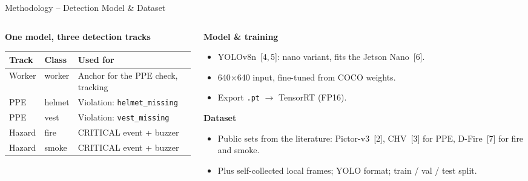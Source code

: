 \documentclass[aspectratio=169,10pt]{beamer}
\begin{document}
\begin{frame}{Methodology -- Detection Model \& Dataset}
  \begin{columns}[T]
    \begin{column}{0.48\textwidth}
      \small\textbf{One model, three detection tracks}\par\vspace{0.3em}
      \scriptsize
      \renewcommand{\arraystretch}{1.2}
      \begin{tabular}{@{}lll@{}}
        \toprule
        \textbf{Track} & \textbf{Class} & \textbf{Used for}\\
        \midrule
        Worker & worker & Anchor for the PPE check, tracking\\
        PPE    & helmet & Violation: \texttt{helmet\_missing}\\
        PPE    & vest   & Violation: \texttt{vest\_missing}\\
        Hazard & fire   & CRITICAL event + buzzer\\
        Hazard & smoke  & CRITICAL event + buzzer\\
        \bottomrule
      \end{tabular}
    \end{column}
    \begin{column}{0.48\textwidth}
      \small\textbf{Model \& training}
      \begin{itemize}\scriptsize
        \item YOLOv8n~[4,\,5]: nano variant, fits the Jetson Nano~[6].
        \item 640$\times$640 input, fine-tuned from COCO weights.
        \item Export \texttt{.pt} $\rightarrow$ TensorRT (FP16).
      \end{itemize}
      \small\textbf{Dataset}
      \begin{itemize}\scriptsize
        \item Public sets from the literature: Pictor-v3~[2], CHV~[3] for PPE, D-Fire~[7] for fire
              and smoke.
        \item Plus self-collected local frames; YOLO format; train / val / test split.
      \end{itemize}
    \end{column}
  \end{columns}
\end{frame}
\end{document}

